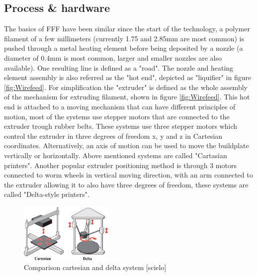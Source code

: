 \subsection{Process \& hardware}
    \label{Hardware}
The basics of FFF have been  similar since the start of the technology, a polymer filament of a few millimeters (currently 1.75 and 2.85mm are most common) is pushed through a metal heating element before being deposited by a nozzle (a diameter of 0.4mm is most common, larger and smaller nozzles are also available). One resulting line is defined as a "road". The nozzle and heating element assembly is also referred as the "hot end", depicted as "liquifier" in figure \ref{fig:Wirefeed}. For simplification the "extruder" is defined as the whole assembly of the mechanism for extruding filament, shown in figure \ref{fig:Wirefeed}. This hot end is attached to a moving mechanism that can have different principles of motion, most of the systems use stepper motors that are connected to the extruder trough rubber belts. These systems use three stepper motors which control the extruder in three degrees of freedom x, y and z in Cartesian coordinates. Alternatively, an axis of motion can be used to move the buildplate vertically or horizontally. Above mentioned systems are called "Cartasian printers". Another popular extruder positioning method is through 3 motors connected to worm wheels in vertical moving direction, with an arm connected to the extruder allowing it to also have three degrees of freedom, these systems are called "Delta-style printers". 

\begin{figure}[H]
    \centering
    \includegraphics[width=0.40\textwidth]{chapter_2/figures/cartesiandelta.jpg}
    \caption{Comparison cartesian and delta system [scielo]}
    \label{fig:cartesiandelta}
\end{figure}

